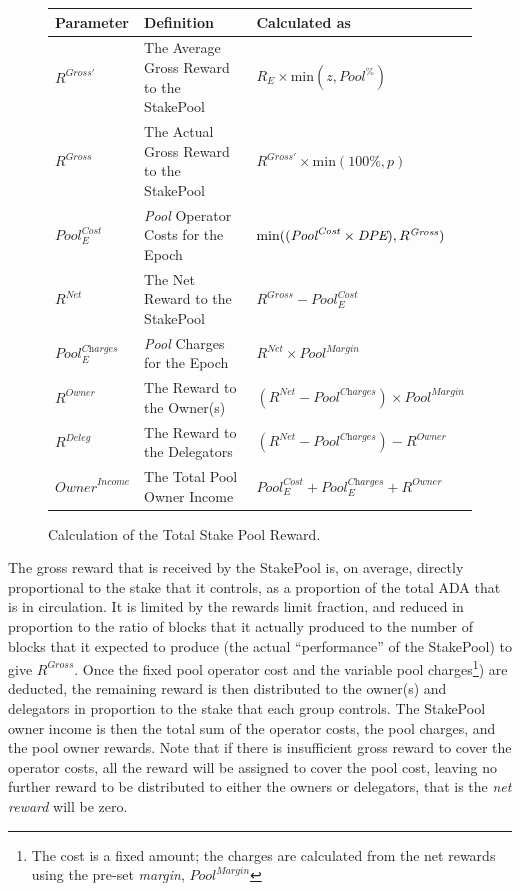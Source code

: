 \documentclass[11pt,a4paper,dvipsnames,twosided,final]{article}
\newcommand{\ada}{ADA{}}
\begin{document}
\clearpage
\begin{figure}[h!]
\begin{center}
\begin{tabular}{||l|p{7.8cm}|l||}
  \hline \hline
\textbf{Parameter}  & \textbf{Definition} & \textbf{Calculated as} \\\hline
$R^{Gross'}$ & The Average Gross Reward to the StakePool & $R_E \times \textrm{min} (z,{\textit{Pool}}^\%)$ \\\hline
$R^{\textit{Gross}}$ & The Actual Gross Reward to the StakePool & $R^{Gross'} \times \textrm{min} (100\%,p)$ \\\hline
${\textit{Pool}}^{\textit{Cost}}_E$ & \textit{Pool} Operator Costs for the Epoch & $\textrm{min}((\textit{\textit{Pool}}^{\textit{Cost}} \times \textit{DPE}),R^{\textit{Gross}})$ \\\hline
$R^{\textit{Net}}$  & The Net Reward to the StakePool & $R^{\textit{Gross}} - {\textit{Pool}}^{\textit{Cost}}_E$ \\\hline
${\textit{Pool}}^{\textit{Charges}}_E$ & \textit{Pool} Charges for the Epoch & $R^{\textit{Net}} \times \textit{Pool}^{\textit{Margin}}$ \\\hline
$R^{Owner}$ & The Reward to the Owner(s) & $(R^{\textit{Net}}-\textit{Pool}^{\textit{Charges}}) \times {\textit{Pool}}^{\textit{Margin}} $ \\\hline
$R^{Deleg}$ & The Reward to the Delegators & $(R^{\textit{Net}}-\textit{Pool}^{\textit{Charges}}) - R^{Owner}$ \\\hline
$\textit{Owner}^\textit{Income}$ & The Total Pool Owner Income &  ${\textit{Pool}}^{\textit{Cost}}_E + {\textit{Pool}}^{\textit{Charges}}_E + R^{Owner}$ \\\hline
\hline
\end{tabular}
\end{center}
\caption{Calculation of the Total Stake Pool Reward.}
\end{figure}

\noindent
The gross reward that is received by the StakePool is, on average, directly proportional to the
stake that it controls, as a proportion of the total \ada{} that is in circulation.
It is limited by the rewards limit fraction, and reduced in proportion to the ratio of blocks that it actually produced
to the number of blocks that it expected to produce (the actual ``performance'' of the StakePool) to give $R^{\textit{Gross}}$.
Once the fixed pool operator cost and the variable pool charges\footnote{The cost is a fixed amount; the charges are calculated from the net rewards using the pre-set \emph{margin}, $\textit{Pool}^{\textit{Margin}}$}) are deducted,
the remaining reward is then distributed to the owner(s) and delegators in proportion to the
stake that each group controls.  The StakePool owner income is then the total sum of the operator costs, the pool charges,
and the pool owner rewards.
Note that if there is insufficient gross reward to cover the operator costs, all the reward will be assigned to cover the
pool cost, leaving no further reward to be distributed to either the owners or delegators, that is the \emph{net reward} will be zero.
\end{document}
